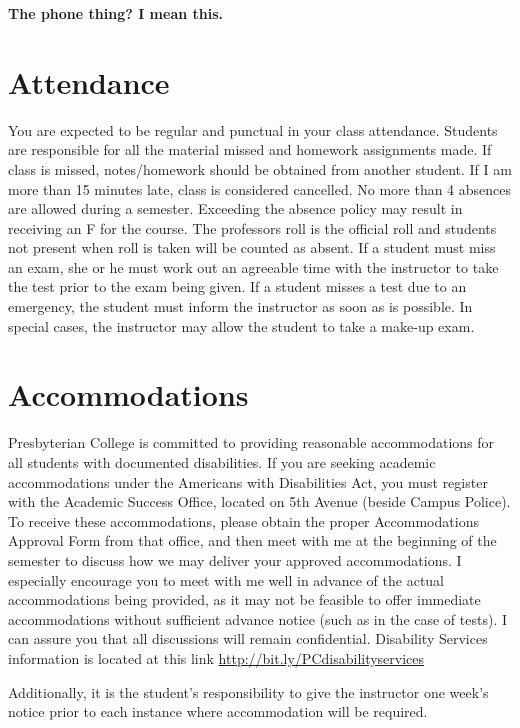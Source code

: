 \documentclass[
]{book}
\begin{document}
\textbf{The phone thing? I mean this.}

\hypertarget{attendance}{%
\section{Attendance}\label{attendance}}

You are expected to be regular and punctual in your class attendance. Students are responsible for all the material missed and homework assignments made. If class is missed, notes/homework should be obtained from another student. If I am more than 15 minutes late, class is considered cancelled. No more than 4 absences are allowed during a semester. Exceeding the absence policy may result in receiving an F for the course. The professors roll is the official roll and students not present when roll is taken will be counted as absent. If a student must miss an exam, she or he must work out an agreeable time with the instructor to take the test prior to the exam being given. If a student misses a test due to an emergency, the student must inform the instructor as soon as is possible. In special cases, the instructor may allow the student to take a make-up exam.

\hypertarget{accommodations}{%
\section{Accommodations}\label{accommodations}}

Presbyterian College is committed to providing reasonable accommodations for all students with documented disabilities. If you are seeking academic accommodations under the Americans with Disabilities Act, you must register with the Academic Success Office, located on 5th Avenue (beside Campus Police). To receive these accommodations, please obtain the proper Accommodations Approval Form from that office, and then meet with me at the beginning of the semester to discuss how we may deliver your approved accommodations. I especially encourage you to meet with me well in advance of the actual accommodations being provided, as it may not be feasible to offer immediate accommodations without sufficient advance notice (such as in the case of tests). I can assure you that all discussions will remain confidential. Disability Services information is located at this link \url{http://bit.ly/PCdisabilityservices}

Additionally, it is the student's responsibility to give the instructor one week's notice prior to each instance where accommodation will be required.
\end{document}
